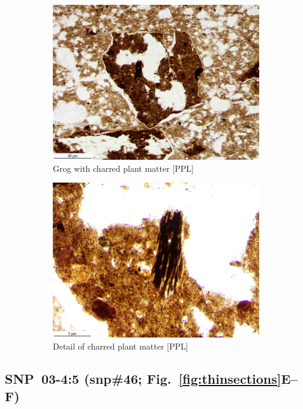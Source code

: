 \documentclass[a4paper]{article}
\begin{document}
\begin{figure}[H]
\begin{subfigure}[t]{.49\textwidth}
		\includegraphics[width=\textwidth]{ThinSections/45-2_10x_PPL.jpg}
		\caption{Grog with charred plant matter [PPL]}
	\end{subfigure}\hspace{.5em}\hfill
	\begin{subfigure}[t]{.49\textwidth}
		\includegraphics[width=\textwidth]{ThinSections/45-2_40x_PPL.jpg}
		\caption{Detail of charred plant matter [PPL]}
	\end{subfigure}
	\caption{}
	\label{fig:45_snp}
\end{figure}

\newpage\subsection{SNP~03-4:5 (snp\#46; Fig.~\ref{fig:thinsections}E--F)}
\end{document}
